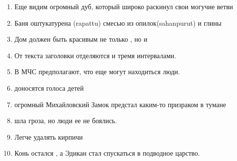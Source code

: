 \documentclass[paper=a4, fontsize=11pt]{scrartcl}
\begin{document}
\begin{enumerate}

    \item 	Еще \raisebox{-0.1cm}{\shortstack{\underline{\hspace{3cm}}}}  видим огромный дуб, который широко раскинул свои могучие ветви
    \item 	Баня \raisebox{-0.1cm}{\shortstack{\underline{\hspace{3cm}}}} оштукатурена (rapattu) смесью из опилок(sahanpurut) и глины
    \item 	Дом должен быть красивым не только \raisebox{-0.1cm}{\shortstack{\underline{\hspace{3cm}}}} , но и \raisebox{-0.1cm}{\shortstack{\underline{\hspace{3cm}}}} 
    \item  	От текста заголовки отделяются \raisebox{-0.1cm}{\shortstack{\underline{\hspace{3cm}}}}  и \raisebox{-0.1cm}{\shortstack{\underline{\hspace{3cm}}}}  тремя интервалами.
    \item 	В МЧС предполагают, что \raisebox{-0.1cm}{\shortstack{\underline{\hspace{3cm}}}}  еще могут находиться люди.
    \item 	\raisebox{-0.1cm}{\shortstack{\underline{\hspace{3cm}}}}  доносятся голоса детей
    \item  	\raisebox{-0.1cm}{\shortstack{\underline{\hspace{3cm}}}} огромный Михайловский Замок предстал каким-то призраком в тумане
    \item 	\raisebox{-0.1cm}{\shortstack{\underline{\hspace{3cm}}}}  шла гроза, но люди ее не боялись.
    \item 	Легче удалять кирпичи \raisebox{-0.1cm}{\shortstack{\underline{\hspace{3cm}}}} 
    \item  Конь остался \raisebox{-0.1cm}{\shortstack{\underline{\hspace{3cm}}}}, а Эдикан стал спускаться в подводное царство.


\end{enumerate}
\end{document}
